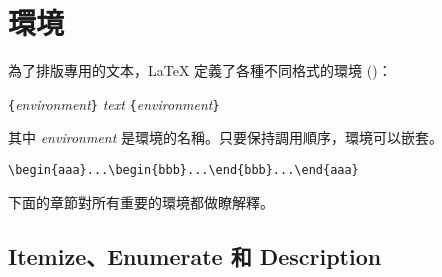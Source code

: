 \section{環境} \label{env}

 為了排版專用的文本，\LaTeX{} 定義了各種不同格式的環境 ()：
\begin{lscommand}
\verb|{|\emph{environment}\verb|}|\quad
   \emph{text}\quad
{}\verb|{|\emph{environment}\verb|}|
\end{lscommand}
\noindent
其中 \emph{environment} 是環境的名稱。只要保持調用順序，環境可以嵌套。
\begin{code}
\verb|\begin{aaa}...\begin{bbb}...\end{bbb}...\end{aaa}|
\end{code}


\noindent 下面的章節對所有重要的環境都做瞭解釋。

\subsection{Itemize、Enumerate 和 Description}


